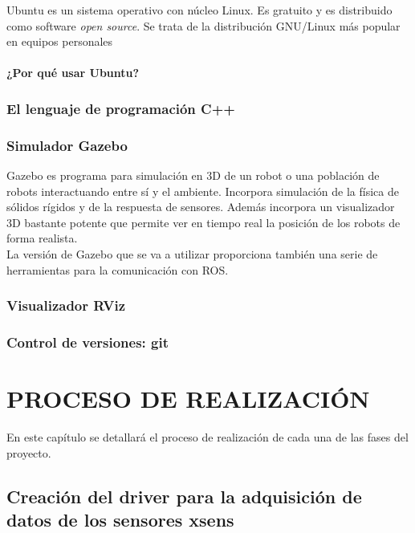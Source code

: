 \documentclass[10pt,a4paper]{report}
\begin{document}
Ubuntu es un sistema operativo con núcleo Linux. Es gratuito y es distribuido como software \textit{open source}. Se trata de la distribución GNU/Linux más popular en equipos personales

\subsubsection{¿Por qué usar Ubuntu?}

\subsection{El lenguaje de programación C++}



\subsection{Simulador Gazebo}

Gazebo es programa para simulación en 3D de un robot o una población de robots interactuando entre sí y el ambiente. Incorpora simulación de la física de sólidos rígidos y de la respuesta de sensores. Además incorpora un visualizador 3D bastante potente que permite ver en tiempo real la posición de los robots de forma realista.\\

La versión de Gazebo que se va a utilizar proporciona también una serie de herramientas para la comunicación con ROS. 
 

\subsection{Visualizador RViz}

\subsection{Control de versiones: git}


\chapter{PROCESO DE REALIZACIÓN}

En este capítulo se detallará el proceso de realización de cada una de las fases del proyecto.

\section{Creación del driver para la adquisición de datos de los sensores xsens}
\end{document}

